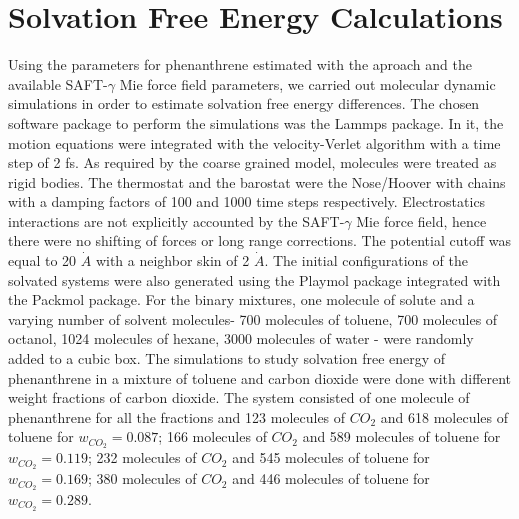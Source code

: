 \section{Solvation Free Energy Calculations}\label{solvme}

Using the parameters for phenanthrene estimated with the  aproach  and the available SAFT-$\gamma$ Mie force field parameters, we carried out molecular dynamic simulations in order to estimate solvation free energy differences. The chosen software package to perform the simulations was the Lammps package\cite{lammps}. In it, the motion equations were integrated with the velocity-Verlet algorithm \cite{verlet} with a time step of 2 fs. As required by the coarse grained model,  molecules were treated as rigid bodies. The thermostat and the barostat were the Nose/Hoover with chains with a damping factors of 100 and 1000 time steps respectively. Electrostatics interactions are not explicitly accounted by the SAFT-$\gamma$ Mie force field, hence there were no shifting of forces or long range corrections. The potential cutoff was equal to 20 $\dot{A}$ \cite{muller2017} with a neighbor skin of 2 $\dot{A}$. The initial configurations of the  solvated systems were also generated using the Playmol package integrated with the Packmol package. For the binary mixtures, one molecule of solute and a varying number of solvent molecules- 700 molecules of toluene, 700 molecules of octanol, 1024 molecules of hexane, 3000 molecules of water - were randomly added to a cubic box. The simulations to study solvation free energy of phenanthrene in a mixture of toluene and carbon dioxide were done with different weight fractions of carbon dioxide. The  system consisted of one molecule of phenanthrene for all the fractions and 123 molecules of $CO_{2}$ and 618 molecules of toluene for $w_{CO_{2}} = 0.087$; 166 molecules of $CO_{2}$ and 589 molecules of toluene for $w_{CO_{2}} = 0.119$; 232 molecules of $CO_{2}$ and 545 molecules of toluene for $w_{CO_{2}} = 0.169$; 380 molecules of $CO_{2}$ and 446 molecules of toluene for $w_{CO_{2}} = 0.289$.

